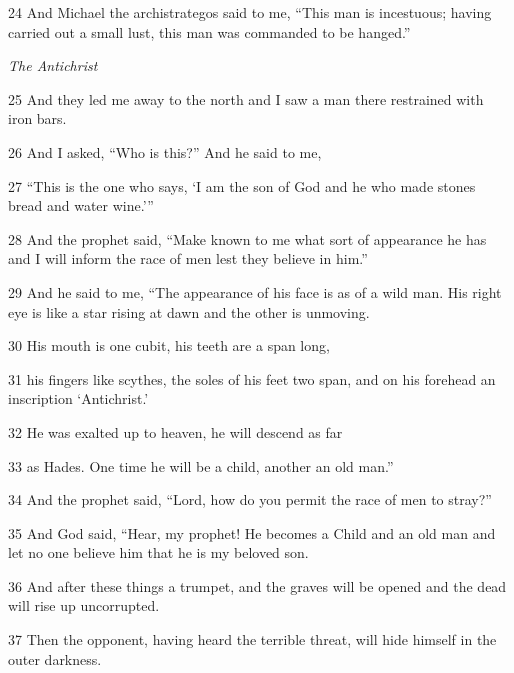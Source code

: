 \par 24 And Michael the archistrategos said to me, “This man is incestuous; having carried out a small lust, this man was commanded to be hanged.”

\par \textit{The Antichrist}

\par 25 And they led me away to the north and I saw a man there restrained with iron bars.

\par 26 And I asked, “Who is this?” And he said to me, 

\par 27 “This is the one who says, ‘I am the son of God and he who made stones bread and water wine.’”

\par 28 And the prophet said, “Make known to me what sort of appearance he has and I will inform the race of men lest they believe in him.”

\par 29 And he said to me, “The appearance of his face is as of a wild man. His right eye is like a star rising at dawn and the other is unmoving.

\par 30 His mouth is one cubit, his teeth are a span long,

\par 31 his fingers like scythes, the soles of his feet two span, and on his forehead an inscription ‘Antichrist.’

\par 32 He was exalted up to heaven, he will descend as far

\par 33 as Hades. One time he will be a child, another an old man.” 

\par 34 And the prophet said, “Lord, how do you permit the race of men to stray?”

\par 35 And God said, “Hear, my prophet! He becomes a Child and an old man and let no one believe him that he is my beloved son.

\par 36 And after these things a trumpet, and the graves will be opened and the dead will rise up uncorrupted.

\par 37 Then the opponent, having heard the terrible threat, will hide himself in the outer darkness.


